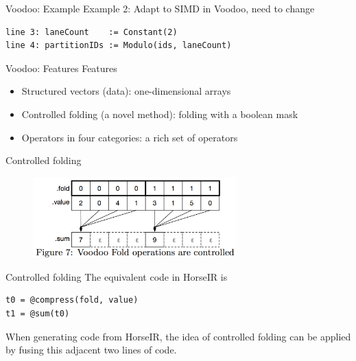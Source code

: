 \begin{frame}[fragile]{Voodoo: Example}
Example 2: Adapt to SIMD in Voodoo, need to change
\begin{lstlisting}[basicstyle=\small]
line 3: laneCount    := Constant(2)
line 4: partitionIDs := Modulo(ids, laneCount)
\end{lstlisting}
\end{frame}


\begin{frame}{Voodoo: Features}
Features
\begin{itemize}
\item Structured vectors (data): one-dimensional arrays
\item Controlled folding (a novel method): folding with a boolean mask
\item Operators in four categories: a rich set of operators
\end{itemize}
\end{frame}

\begin{frame}{Controlled folding}
\begin{figure}[htb]
\includegraphics[width=0.7\textwidth]{fig/voodoo-fig7.png}
\end{figure}
\end{frame}

\begin{frame}[fragile]{Controlled folding}
The equivalent code in HorseIR is
\begin{lstlisting}[language=HorseIR, basicstyle=\footnotesize]
t0 = @compress(fold, value)
t1 = @sum(t0)
\end{lstlisting}
When generating code from HorseIR, the idea of controlled folding can be
applied by fusing this adjacent two lines of code.
\end{frame}

